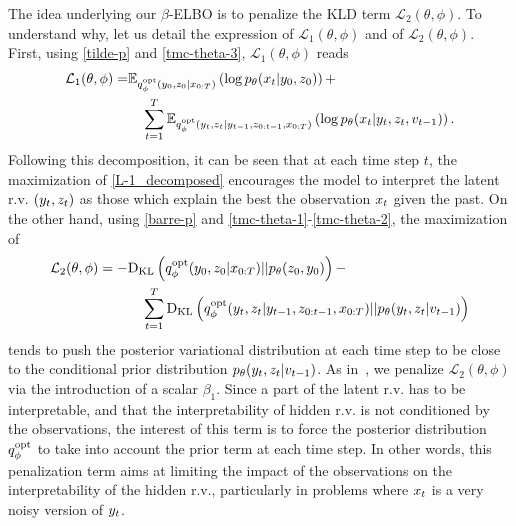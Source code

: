 The idea underlying our $\beta$-ELBO is to penalize the KLD term $\mathcal{L}_2(\theta,\phi)$. To understand why, let us detail 
the expression of $\mathcal{L}_1(\theta,\phi)$ and of $\mathcal{L}_2(\theta,\phi)$. First,
using \eqref{tilde-p} and \eqref{tmc-theta-3},
$\mathcal{L}_1(\theta,\phi)$ reads 
\begin{align}
\label{L-1_decomposed}
\mathcal{L}_1(\theta,\phi)=& {{\mathbb{E}}}_{q_\phi^{\rm opt}(y_0,z_0|x_{0:T})}\left(\log p_{\theta}(x_t|y_0, z_0) \right) +
\nonumber\\ & \quad  
\sum_{t=1}^T {{\mathbb{E}}}_{q_\phi^{\rm opt}(y_t,z_t|y_{t-1},z_{0:t-1},x_{0:T})}\left(\log
{p_{\theta}(x_t|y_t,z_t,{v}_{t-1})}
\right).
\end{align}
Following this decomposition, it can be seen that at each time step $t$,
the maximization of \eqref{L-1_decomposed} encourages the model to interpret
the latent r.v. $(y_t,z_t)$ as those which explain the best the observation
$x_t$ given the past.
On the other hand, using \eqref{barre-p} and
\eqref{tmc-theta-1}-\eqref{tmc-theta-2},
the maximization of  %
\begin{align}
\label{L-2_decomposed}
\mathcal{L}_2(\theta,\phi)=-&
\dkl \left(\q^{\rm opt}(\lab_0,\latent_0|\obs_{0:T})|| \p(\latent_0,\lab_0) %
\right)
- 
\nonumber\\& \quad 
\sum_{t=1}^T \dkl \left(\q^{\rm opt}(\lab_t,\latent_t|\lab_{t-1},\latent_{0:t-1},\obs_{0:T})|| 
\p(\lab_t,\latent_t|\triplet_{t-1})
\right)
\end{align}
tends to push the posterior variational distribution at each time step
to be close to the conditional prior distribution $p_{\theta}(y_t,z_t|{v}_{t-1})$.
As in~\citep{higgins2017beta}, we penalize $\mathcal{L}_2(\theta,\phi)$ via the introduction of a scalar $\beta_1$. Since a part of the latent r.v. has
to be interpretable, and that the interpretability of hidden r.v.
is not conditioned by the observations, the interest of this term is to
force the posterior distribution $q_\phi^{\rm opt}$ to take into account the prior term at each time step.
In other words, this penalization term
aims at limiting the impact of the observations 
on the interpretability of the hidden r.v.,
particularly in problems where $x_t$ is a very noisy version of $y_t$.

